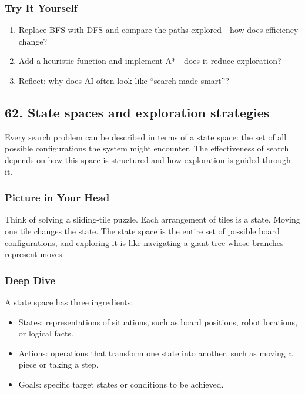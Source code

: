 \documentclass[
  letterpaper,
  DIV=11,
  numbers=noendperiod]{scrreprt}
\providecommand{\tightlist}{%
  \setlength{\itemsep}{0pt}\setlength{\parskip}{0pt}}
\begin{document}
\subsubsection{Try It Yourself}\label{try-it-yourself-60}

\begin{enumerate}
\def\labelenumi{\arabic{enumi}.}
\tightlist
\item
  Replace BFS with DFS and compare the paths explored---how does
  efficiency change?
\item
  Add a heuristic function and implement A*---does it reduce
  exploration?
\item
  Reflect: why does AI often look like ``search made smart''?
\end{enumerate}

\subsection{62. State spaces and exploration
strategies}\label{state-spaces-and-exploration-strategies}

Every search problem can be described in terms of a state space: the set
of all possible configurations the system might encounter. The
effectiveness of search depends on how this space is structured and how
exploration is guided through it.

\subsubsection{Picture in Your Head}\label{picture-in-your-head-61}

Think of solving a sliding-tile puzzle. Each arrangement of tiles is a
state. Moving one tile changes the state. The state space is the entire
set of possible board configurations, and exploring it is like
navigating a giant tree whose branches represent moves.

\subsubsection{Deep Dive}\label{deep-dive-61}

A state space has three ingredients:

\begin{itemize}
\tightlist
\item
  States: representations of situations, such as board positions, robot
  locations, or logical facts.
\item
  Actions: operations that transform one state into another, such as
  moving a piece or taking a step.
\item
  Goals: specific target states or conditions to be achieved.
\end{itemize}
\end{document}
